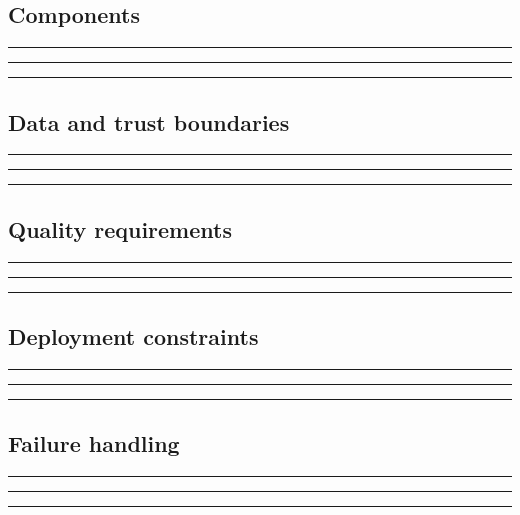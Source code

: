 \documentclass[11pt]{article}
\begin{document}
\subsection{Components}
\noindent\rule{\linewidth}{0.3pt}\par\vspace{0.18in}
\noindent\rule{\linewidth}{0.3pt}\par\vspace{0.18in}
\noindent\rule{\linewidth}{0.3pt}\par\vspace{0.14in}

\subsection{Data and trust boundaries}
\noindent\rule{\linewidth}{0.3pt}\par\vspace{0.18in}
\noindent\rule{\linewidth}{0.3pt}\par\vspace{0.18in}
\noindent\rule{\linewidth}{0.3pt}\par\vspace{0.14in}

\subsection{Quality requirements}
\noindent\rule{\linewidth}{0.3pt}\par\vspace{0.18in}
\noindent\rule{\linewidth}{0.3pt}\par\vspace{0.18in}
\noindent\rule{\linewidth}{0.3pt}\par\vspace{0.14in}

\subsection{Deployment constraints}
\noindent\rule{\linewidth}{0.3pt}\par\vspace{0.18in}
\noindent\rule{\linewidth}{0.3pt}\par\vspace{0.18in}
\noindent\rule{\linewidth}{0.3pt}\par\vspace{0.14in}

\subsection{Failure handling}
\noindent\rule{\linewidth}{0.3pt}\par\vspace{0.18in}
\noindent\rule{\linewidth}{0.3pt}\par\vspace{0.18in}
\noindent\rule{\linewidth}{0.3pt}\par\vspace{0.14in}
\end{document}
